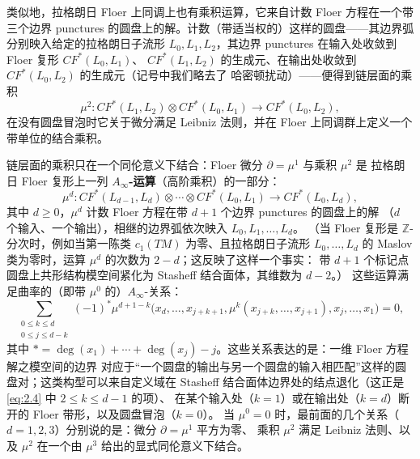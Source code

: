 \documentclass[UTF8,a4paper,11pt,fontset=windows]{ctexart}
\theoremstyle{cnthm}
\numberwithin{equation}{section}
\newcommand{\Z}{\mathbb{Z}}
\newcommand{\CF}{CF}                  %
\begin{document}
类似地，拉格朗日 Floer 上同调上也有乘积运算，它来自计数 Floer 方程在一个带三个边界 punctures
的圆盘上的解。计数（带适当权的）这样的圆盘——其边界弧分别映入给定的拉格朗日子流形
$L_0,L_1,L_2$，其边界 punctures 在输入处收敛到 Floer 复形 $\CF^{*}(L_0,L_1)$、
$\CF^{*}(L_1,L_2)$ 的生成元、在输出处收敛到 $\CF^{*}(L_0,L_2)$ 的生成元（记号中我们略去了
哈密顿扰动）——便得到链层面的乘积
\[
\mu^{2}:\CF^{*}(L_1,L_2)\otimes\CF^{*}(L_0,L_1)\longrightarrow\CF^{*}(L_0,L_2),
\]
在没有圆盘冒泡时它关于微分满足 Leibniz 法则，并在 Floer 上同调群上定义一个带单位的结合乘积。


链层面的乘积只在一个同伦意义下结合：Floer 微分 $\partial=\mu^{1}$ 与乘积 $\mu^{2}$ 是
拉格朗日 Floer 复形上一列 \textbf{$A_\infty$-运算}（高阶乘积）的一部分：
\begin{equation}\label{eq:2.3}
\mu^{d}:\CF^{*}(L_{d-1},L_d)\otimes\cdots\otimes\CF^{*}(L_0,L_1)\longrightarrow\CF^{*}(L_0,L_d),
\end{equation}
其中 $d\ge0$，$\mu^{d}$ 计数 Floer 方程在带 $d+1$ 个边界 punctures 的圆盘上的解
（$d$ 个输入、一个输出），相继的边界弧依次映入 $L_0,L_1,\dots,L_d$。
（当 Floer 复形是 $\Z$-分次时，例如当第一陈类 $c_1(TM)$ 为零、且拉格朗日子流形
$L_0,\dots,L_d$ 的 Maslov 类为零时，运算 $\mu^{d}$ 的次数为 $2-d$；这反映了这样一个事实：
带 $d+1$ 个标记点圆盘上共形结构模空间紧化为 Stasheff 结合面体，其维数为 $d-2$。）
这些运算满足曲率的（即带 $\mu^{0}$ 的）$A_\infty$-关系：
\begin{equation}\label{eq:2.4}
\sum_{\substack{0\le k\le d\\ 0\le j\le d-k}}
(-1)^{*}\mu^{d+1-k}\bigl(x_d,\dots,x_{j+k+1},\mu^{k}(x_{j+k},\dots,x_{j+1}),x_j,\dots,x_1\bigr)=0,
\end{equation}
其中 $*=\deg(x_1)+\cdots+\deg(x_j)-j$。这些关系表达的是：一维 Floer 方程解之模空间的边界
对应于“一个圆盘的输出与另一个圆盘的输入相匹配”这样的圆盘对；这类构型可以来自定义域在
Stasheff 结合面体边界处的结点退化（这正是 \eqref{eq:2.4} 中 $2\le k\le d-1$ 的项）、
在某个输入处（$k=1$）或在输出处（$k=d$）断开的 Floer 带形，以及圆盘冒泡（$k=0$）。
当 $\mu^{0}=0$ 时，最前面的几个关系（$d=1,2,3$）分别说的是：微分 $\partial=\mu^{1}$ 平方为零、
乘积 $\mu^{2}$ 满足 Leibniz 法则、以及 $\mu^{2}$ 在一个由 $\mu^{3}$ 给出的显式同伦意义下结合。
\end{document}
